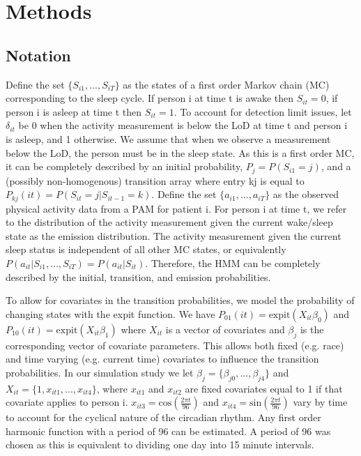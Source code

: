 \documentclass{article}
\begin{document}
\section{Methods} \label{Methods}
\subsection{Notation}

Define the set $\{S_{i1}, ..., S_{iT}\}$ as the states of a first order Markov chain (MC) corresponding to the sleep cycle. If person i at time t is awake then $S_{it}=0$, if person i is asleep at time t then $S_{it}=1$. To account for detection limit issues, let $\delta_{it}$ be 0 when the activity measurement is below the LoD at time t and person i is asleep, and 1 otherwise. We assume that when we observe a measurement below the LoD, the person must be in the sleep state. As this is a first order MC, it can be completely described by an initial probability, $P_j=P(S_{i1} =j)$, and a (possibly non-homogenous) transition array where entry kj is equal to $P_{kj}(it)=P(S_{it}=j|S_{it-1}=k)$. Define the set $\{a_{i1}, ..., a_{iT}\}$ as the observed physical activity data from a PAM for patient i. For person i at time t, we refer to the distribution of the activity measurement given the current wake/sleep state as the emission distribution. The activity measurement given the current sleep status is independent of all other MC states, or equivalently $P(a_{it}|S_{i1}, ..., S_{iT}) = P(a_{it}|S_{it})$. Therefore, the HMM can be completely described by the initial, transition, and emission probabilities.

To allow for covariates in the transition probabilities, we model the probability of changing states with the expit function. We have $P_{01}(it) = \text{expit}(X_{it}\beta_0)$ and $P_{10}(it) = \text{expit}(X_{it}\beta_1)$ where $X_{it}$ is a vector of covariates and $\beta_j$ is the corresponding vector of covariate parameters. This allows both fixed (e.g. race) and time varying (e.g. current time) covariates to influence the transition probabilities. In our simulation study we let $\beta_j = \{\beta_{j0}, ..., \beta_{j4}\}$ and $X_{it} = \{1, x_{it1}, ..., x_{it4}\}$, where $x_{it1}$ and $x_{it2}$ are fixed covariates equal to 1 if that covariate applies to person i. $x_{it3} = \text{cos}(\frac{2\pi t}{96})$ and $x_{it4} = \text{sin}(\frac{2\pi t}{96})$ vary by time to account for the cyclical nature of the circadian rhythm.  Any first order harmonic function with a period of 96 can be estimated. A period of 96 was chosen as this is equivalent to dividing one day into 15 minute intervals.
\end{document}
